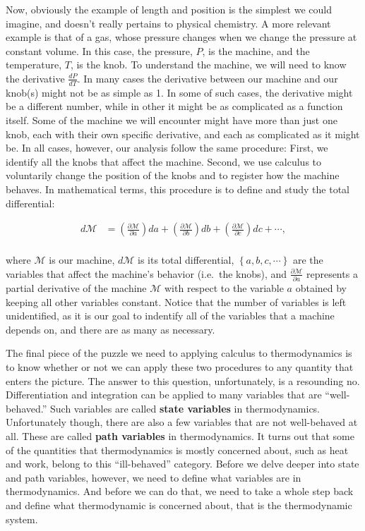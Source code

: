 \documentclass[
  9pt,
]{extbook}
\theoremstyle{definition}
\theoremstyle{definition}
\theoremstyle{definition}
\theoremstyle{remark}
\begin{document}
Now, obviously the example of length and position is the simplest we could imagine, and doesn't really pertains to physical chemistry. A more relevant example is that of a gas, whose pressure changes when we change the pressure at constant volume. In this case, the pressure, \(P\), is the machine, and the temperature, \(T\), is the knob. To understand the machine, we will need to know the derivative \(\frac{dP}{dT}\). In many cases the derivative between our machine and our knob(s) might not be as simple as 1. In some of such cases, the derivative might be a different number, while in other it might be as complicated as a function itself. Some of the machine we will encounter might have more than just one knob, each with their own specific derivative, and each as complicated as it might be. In all cases, however, our analysis follow the same procedure: First, we identify all the knobs that affect the machine. Second, we use calculus to voluntarily change the position of the knobs and to register how the machine behaves. In mathematical terms, this procedure is to define and study the total differential:

\begin{equation}
\begin{aligned}
d\mathcal{M} &= \left( \frac{\partial \mathcal{M}}{\partial a} \right) da + \left( \frac{\partial \mathcal{M}}{\partial b} \right) db + \left( \frac{\partial \mathcal{M}}{\partial c} \right) dc + \cdots ,\\
\end{aligned}
\label{eq:totdiff}
\end{equation}

where \(\mathcal{M}\) is our machine, \(d\mathcal{M}\) is its total differential, \(\left\{a,b,c,\cdots\right\}\) are the variables that affect the machine's behavior (i.e.~the knobs), and \(\frac{\partial \mathcal{M}}{\partial a}\) represents a partial derivative of the machine \(\mathcal{M}\) with respect to the variable \(a\) obtained by keeping all other variables constant. Notice that the number of variables is left unidentified, as it is our goal to indentify all of the variables that a machine depends on, and there are as many as necessary.

The final piece of the puzzle we need to applying calculus to thermodynamics is to know whether or not we can apply these two procedures to any quantity that enters the picture. The answer to this question, unfortunately, is a resounding no. Differentiation and integration can be applied to many variables that are ``well-behaved.'' Such variables are called \textbf{state variables} in thermodynamics. Unfortunately though, there are also a few variables that are not well-behaved at all. These are called \textbf{path variables} in thermodynamics. It turns out that some of the quantities that thermodynamics is mostly concerned about, such as heat and work, belong to this ``ill-behaved'' category. Before we delve deeper into state and path variables, however, we need to define what variables are in thermodynamics. And before we can do that, we need to take a whole step back and define what thermodynamic is concerned about, that is the thermodynamic system.
\end{document}
